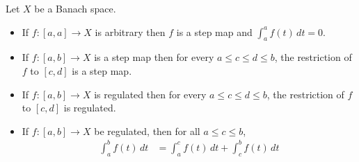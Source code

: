 \begin{prop}\label{banach:RiemannIntegralProperties}Let
  $X$ be a Banach space.
  \begin{itemize}
  \item[(i)] If $f : [a,a] \to X$ is arbitrary then $f$ is a step map and $\int_a^a f(t) \, dt = 0$.
 \item[(ii)] If $f : [a,b] \to X$ is a step map then for every $a \leq c \leq d \leq b$, the restriction of $f$ to $[c,d]$ is a step map.
 \item[(iii)] If $f : [a,b] \to X$ is regulated then for every $a \leq c \leq d \leq b$, the restriction of $f$ to $[c,d]$ is regulated.
  \item[(iv)] If $f : [a,b] \to X$ be regulated, then for all $a \leq c \leq b$, 
\begin{align*}
\int_a^b f(t) \, dt &= \int_a^c f(t) \, dt + \int_c^b f(t) \, dt
\end{align*}
\end{itemize}
\end{prop}
